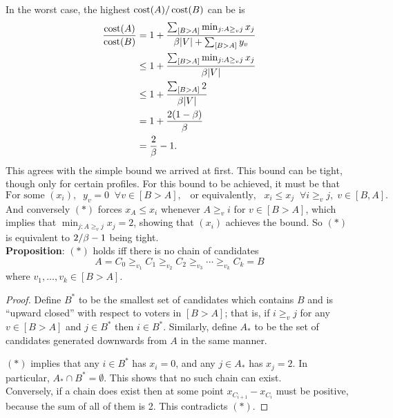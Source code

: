 \documentclass{amsart}
\DeclareMathOperator{\cost}{\rm{cost}}
\begin{document}
In the worst case, the highest $\cost(A)/\cost(B)$ can be is 
\begin{align*}
\frac{\cost(A)}{\cost(B)} &= 1 + \frac{\sum_{[B>A]} \min_{j:A\geq_v j} x_j}{ \b |V| + \sum_{[B>A]} y_v} \\
&\leq 1 + \frac{\sum_{[B>A]} \min_{j:A\geq_v j} x_j}{ \b |V|} \\
&\leq  1 + \frac{\sum_{[B>A]} 2}{ \b |V|} \\
&= 1 + \frac{2(1-\b)}{\b}\\
&= \frac{2}{\b} - 1.
\end{align*}
This agrees with the simple bound we arrived at first. This bound can be tight, though only for certain profiles. For this bound to be achieved, it must be that 
\begin{equation}
	\tag{$\ast$}
	\text{For some $(x_i)$}, \;\; y_v = 0 \;\; \forall v\in [B>A], \;\;\; \text{or equivalently,} \;\;\; x_i \leq x_j \;\; \forall i \geq_v j, \; v\in [B,A].
\end{equation}
And conversely $(\ast)$ forces $x_A \leq x_i$ whenever $A\geq_v i$ for $v\in [B>A]$, which implies that $\min_{j:A\geq_v j} x_j = 2$, showing that $(x_i)$ achieves the bound. So $(\ast)$ is equivalent to $2/\beta - 1$ being tight.\\

%

\textbf{Proposition}: $(\ast)$ holds iff there is no chain of candidates 
$$
A = C_0\geq_{v_1} C_1 \geq_{v_2} C_2 \geq_{v_3} \cdots \geq_{v_{k}} C_{k} = B
$$
where $v_1,\dots,v_k\in [B>A]$.
\begin{proof}
	Define $B^*$ to be the smallest set of candidates which contains $B$ and is ``upward closed'' with respect to voters in $[B>A]$; that is, if $i\geq_v j$ for any $v\in[B>A]$ and $j\in B^*$ then $i\in B^*$. Similarly, define $A_*$ to be the set of candidates generated downwards from $A$ in the same manner.
	
	$(\ast)$ implies that any $i\in B^*$ has $x_i=0$, and any $j\in A_*$ has $x_j=2$. In particular, $A_*\cap B^*=\emptyset$. This shows that no such chain can exist.\\
	
	Conversely, if a chain does exist then at some point $x_{C_{i+1}} - x_{C_i}$ must be positive, because the sum of all of them is 2. This contradicts $(\ast)$. 
\end{proof}\\
\end{document}
